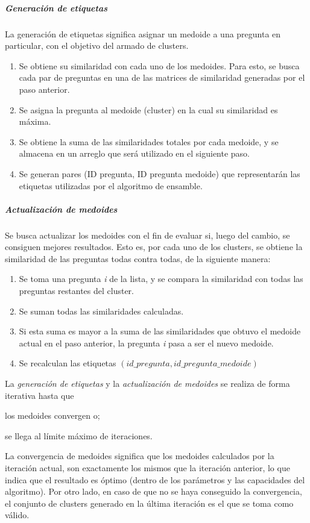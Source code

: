 \subparagraph{Generación de etiquetas}
La generación de etiquetas significa asignar un medoide a una pregunta en particular, con el objetivo del armado de clusters.
\begin{enumerate}
	\item Se obtiene su similaridad con cada uno de los medoides. Para esto, se busca cada par de preguntas en una de las matrices de similaridad generadas por el paso anterior.
	\item Se asigna la pregunta al medoide (cluster) en la cual su similaridad es máxima.
	\item Se obtiene la suma de las similaridades totales por cada medoide, y se almacena en un arreglo que será utilizado en el siguiente paso.
	\item Se generan pares (ID pregunta, ID pregunta medoide) que representarán las etiquetas utilizadas por el algoritmo de ensamble.
\end{enumerate}

\subparagraph{Actualización de medoides}
Se busca actualizar los medoides con el fin de evaluar si, luego del cambio, se consiguen mejores resultados. Esto es, por cada uno de los clusters, se obtiene la similaridad de las preguntas todas contra todas, de la siguiente manera:

\begin{enumerate}
	\item Se toma una pregunta \textit{i} de la lista, y se compara la similaridad con todas las preguntas restantes del cluster.
	\item Se suman todas las similaridades calculadas.
	\item Si esta suma es mayor a la suma de las similaridades que obtuvo el medoide actual en el paso anterior, la pregunta \textit{i} pasa a ser el nuevo medoide.
	\item Se recalculan las etiquetas \((id\_pregunta, id\_pregunta\_medoide)\)
\end{enumerate}

La \textit{generación de etiquetas} y la \textit{actualización de medoides} se realiza de forma iterativa hasta que \begin{enumerate*} [label=(\roman*)] \item los medoides convergen o; \item se llega al límite máximo de iteraciones.\end{enumerate*} La convergencia de medoides significa que los medoides calculados por la iteración actual, son exactamente los mismos que la iteración anterior, lo que indica que el resultado es óptimo (dentro de los parámetros y las capacidades del algoritmo). Por otro lado, en caso de que no se haya conseguido la convergencia, el conjunto de clusters generado en la última iteración es el que se toma como válido.

